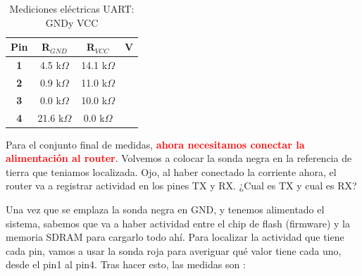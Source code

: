 \documentclass[12pt,a4paper, brazil]{article}
\begin{document}
\begin{table}[htpb]
\centering
\caption{Mediciones eléctricas UART: GNDy VCC}
\label{tab:my-table}
\begin{tabular}{@{}cccc@{}}
\toprule
{\color[HTML]{FE0000} \textbf{Pin}} & {\color[HTML]{FE0000} \textbf{R$_{GND}$}}                 & {\color[HTML]{FE0000} \textbf{R$_{VCC}$}}                 & {\color[HTML]{FE0000} \textbf{V}} \\ \midrule
\multicolumn{1}{|c|}{\textbf{1}}    & \multicolumn{1}{c|}{4.5 k$\Omega$}                        & \multicolumn{1}{c|}{14.1 k$\Omega$}                       &                                   \\ \midrule
\multicolumn{1}{|c|}{\textbf{2}}    & \multicolumn{1}{c|}{0.9 k$\Omega$}                        & \multicolumn{1}{c|}{11.0 k$\Omega$}                       &                                   \\ \midrule
\multicolumn{1}{|c|}{\textbf{3}}    & \multicolumn{1}{c|}{{\color[HTML]{FE0000} 0.0 k$\Omega$}} & \multicolumn{1}{c|}{10.0 k$\Omega$}                       &                                   \\ \midrule
\multicolumn{1}{|c|}{\textbf{4}}    & \multicolumn{1}{c|}{21.6 k$\Omega$}                       & \multicolumn{1}{c|}{{\color[HTML]{FE0000} 0.0 k$\Omega$}} &                                   \\ \bottomrule
\end{tabular}
\end{table}


\begin{tcolorbox}[enhanced, title=ATENCION, colback=red!10]
Para el conjunto final de medidas, \textbf{\textcolor{red}{ahora necesitamos conectar la alimentación al router}}. Volvemos a colocar la sonda negra en la referencia de tierra que teniamos localizada. Ojo, al haber conectado la corriente ahora, el router va a registrar actividad en los pines TX y RX. ¿Cual es TX y cual es RX?
\end{tcolorbox}

Una vez que se emplaza la sonda negra en GND, y tenemos alimentado el sistema, sabemos que va a haber actividad entre el chip de flash (firmware) y la memoria SDRAM para cargarlo todo ahí. Para localizar la actividad que tiene cada pin, vamos a usar la sonda roja para averiguar qué valor tiene cada uno, desde el pin1 al pin4. Tras hacer esto, las medidas son :
\end{document}
